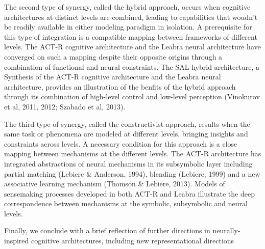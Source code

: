 \documentclass[10pt,fleqn,openany]{book} %
\begin{document}
\begin{enumerate}
{			The second type of synergy, called the hybrid approach, occurs when
			cognitive architectures at distinct levels are combined, leading to
			capabilities that woudn't be readily available in either modeling paradigm
			in isolation.  A prerequisite for this type of integration is a compatible
			mapping between frameworks of different levels.  The ACT-R cognitive
			architecture and the Leabra neural architecture have converged on such a
			mapping despite their opposite origins through a combination of functional
			and neural constraints.  The SAL hybrid architecture, a Synthesis of the
			ACT-R cognitive architecture and the Leabra neural architecture, provides an
			illustration of the benfits of the hybrid approach through its combination
			of high-level control and low-level perception (Vinokurov et al, 2011, 2012;
			Szabado et al, 2013).
			
			The third type of synergy, called the constructivist approach, results when
			the same task or phenomena are modeled at different levels, bringing
			insights and constraints across levels.  A necessary condition for this
			approach is a close mapping between mechanisms at the different levels.  The
			ACT-R architecture has integrated abstractions of neural mechanisms in its
			subsymbolic layer including partial matching (Lebiere \& Anderson, 1994),
			blending (Lebiere, 1999) and a new associative learning mechanism (Thomson \&
			Lebiere, 2013). Models of sensemaking processes developed in both ACT-R
			and Leabra illustrate the deep correspondence between mechanisms at the
			symbolic, subsymbolic and neural levels.
			
			Finally, we conclude with a brief reflection of further directions in
			neurally-inspired cognitive architectures, including new representational
			directions}
		

\end{enumerate}
\end{document}
